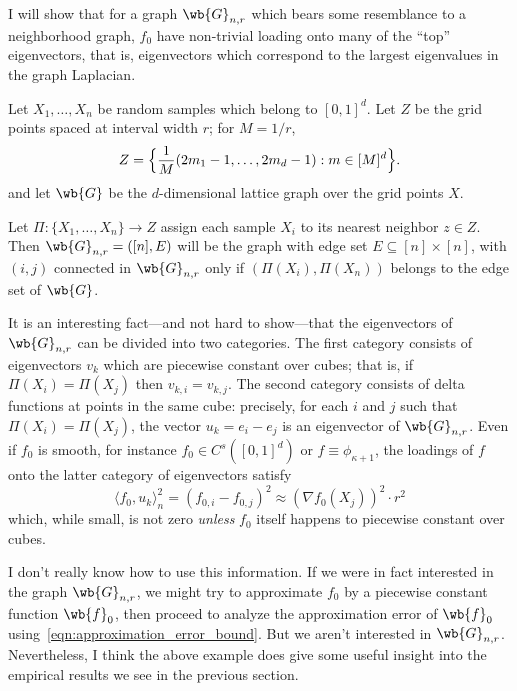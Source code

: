 \documentclass{article}
\newcommand{\1}{\mathbf{1}}
\newcommand{\dotp}[2]{\langle #1, #2 \rangle}
\theoremstyle{alden}
\theoremstyle{aldenthm}
\theoremstyle{definition}
\theoremstyle{remark}
\begin{document}
I will show that for a graph $\wb{G}_{n,r}$ which bears some resemblance to a neighborhood graph, $f_0$ have non-trivial loading onto many of the ``top'' eigenvectors, that is, eigenvectors which correspond to the largest eigenvalues in the graph Laplacian.

Let $X_1,\ldots,X_n$ be random samples which belong to $[0,1]^d$. Let $Z$ be the grid points spaced at interval width $r$; for $M = 1/r$,
\begin{equation*}
Z = \Bigl\{\frac{1}{M}(2m_1 - 1,\ldots,2m_d - 1): m \in [M]^d \Bigr\}.
\end{equation*}
and let $\wb{G}$ be the $d$-dimensional lattice graph over the grid points $X$. 

Let $\Pi: \{X_1,\ldots,X_n\} \to Z$ assign each sample $X_i$ to its nearest neighbor $z \in Z$. Then $\wb{G}_{n,r} = ([n],E)$ will be the graph with edge set $E \subseteq [n] \times [n]$, with $(i,j)$ connected in $\wb{G}_{n,r}$ only if $(\Pi(X_i),\Pi(X_n))$ belongs to the edge set of $\wb{G}$.

It is an interesting fact---and not hard to show---that the eigenvectors of $\wb{G}_{n,r}$ can be divided into two categories. The first category consists of eigenvectors $v_k$ which are piecewise constant over cubes; that is, if $\Pi(X_i) = \Pi(X_j)$ then $v_{k,i} = v_{k,j}$. The second category consists of delta functions at points in the same cube: precisely, for each $i$ and $j$ such that $\Pi(X_i) = \Pi(X_j)$, the vector $u_k = e_i - e_j$ is an eigenvector of $\wb{G}_{n,r}$. Even if $f_0$ is smooth, for instance $f_0 \in C^s([0,1]^d)$ or $f \equiv \phi_{\kappa + 1}$, the loadings of $f$ onto the latter category of eigenvectors satisfy
\begin{equation*}
\dotp{f_0}{u_k}_n^2 = (f_{0,i} - f_{0,j})^2 \approx (\nabla f_0 (X_j))^2 \cdot r^2
\end{equation*}
which, while small, is not zero \emph{unless} $f_0$ itself happens to piecewise constant over cubes. 

I don't really know how to use this information. If we were in fact interested in the graph $\wb{G}_{n,r}$, we might try to approximate $f_0$ by a piecewise constant function $\wb{f}_0$, then proceed to analyze the approximation error of $\wb{f}_0$ using~\eqref{eqn:approximation_error_bound}. But we aren't interested in $\wb{G}_{n,r}$. Nevertheless, I think the above example does give some useful insight into the empirical results we see in the previous section.
\end{document}
